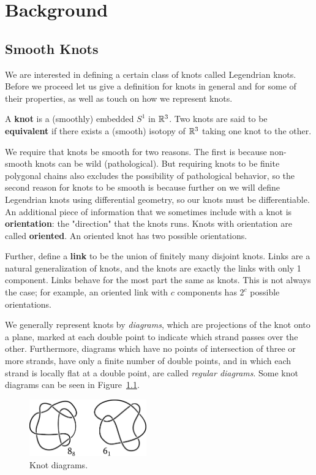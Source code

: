 \chapter{Background}
\section{Smooth Knots}

We are interested in defining a certain class of knots called Legendrian knots. Before we proceed let us give a definition for knots in general and for some of their properties, as well as touch on how we represent knots. 

\begin{definition}\label{defn:knots}
    A \textbf{knot} is a (smoothly) embedded $S^1$ in $\mathbb{R}^3$. Two knots are said to be \textbf{equivalent} if there exists a (smooth) isotopy of $\mathbb{R}^3$ taking one knot to the other.
\end{definition}
We require that knots be smooth for two reasons. The first is because non-smooth knots can be wild (pathological).
But requiring knots to be finite polygonal chains also excludes the possibility of pathological behavior, so the second reason for knots to be smooth is because further on we will define Legendrian knots using differential geometry, so our knots must be differentiable. An additional piece of information that we sometimes include with a knot is \textbf{orientation}: the "direction" that the knots runs. Knots with orientation are called \textbf{oriented}. An oriented knot has two possible orientations.

Further, define a \textbf{link} to be the union of finitely many disjoint knots. Links are a natural generalization of knots, and the knots are exactly the links with only 1 component. Links behave for the most part the same as knots. This is not always the case; for example, an oriented link with $c$ components has $2^c$ possible orientations.


We generally represent knots by \emph{diagrams}, which are projections of the knot onto a plane, marked at each double point to indicate which strand passes over the other.
Furthermore, diagrams which have no points of intersection of three or more strands, have only a finite number of double points, and in which each strand is locally flat at a double point, are called \emph{regular diagrams}. Some knot diagrams can be seen in Figure~\ref{fig:diagrams}.

\begin{figure}[ht]
    \centering
    \includegraphics[width=0.45\textwidth]{images/smooth-knots.pdf}
    \caption{Knot diagrams.}
    \label{fig:diagrams}
\end{figure}

